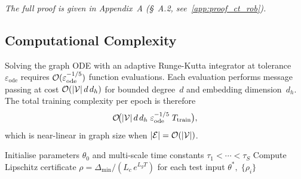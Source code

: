 \noindent\textit{The full proof is given in Appendix~A (\S~A.2, see~\ref{app:proof_ct_rob}).}

\subsection{Computational Complexity}

Solving the graph ODE with an adaptive Runge-Kutta integrator at tolerance~$\varepsilon_{\mathrm{ode}}$ requires $\mathcal{O}(\varepsilon_{\mathrm{ode}}^{-1/5})$ function evaluations. Each evaluation performs message passing at cost $\mathcal{O}(|\mathcal{V}|\,d\,d_h)$ for bounded degree~$d$ and embedding dimension~$d_h$. The total training complexity per epoch is therefore
\begin{equation}
\mathcal{O}\!\bigl(|\mathcal{V}|\,d\,d_h\;\varepsilon_{\mathrm{ode}}^{-1/5}\;T_{\mathrm{train}}\bigr),
\label{eq:ct_tgnn_complex}
\end{equation}
which is near-linear in graph size when $|\mathcal{E}|=\mathcal{O}(|\mathcal{V}|)$.

\begin{algorithm}[htbp]
\caption{CT-TGNN Training with Adjoint Sensitivity}\label{alg:ct_tgnn}
Initialise parameters $\theta_0$ and multi-scale time constants $\tau_1<\cdots<\tau_S$\;
Compute Lipschitz certificate $\rho = \Delta_{\min}/(L_c\,e^{L_g T})$ for each test input\;
\Return $\theta^*,\;\{\rho_i\}$
\end{algorithm}

